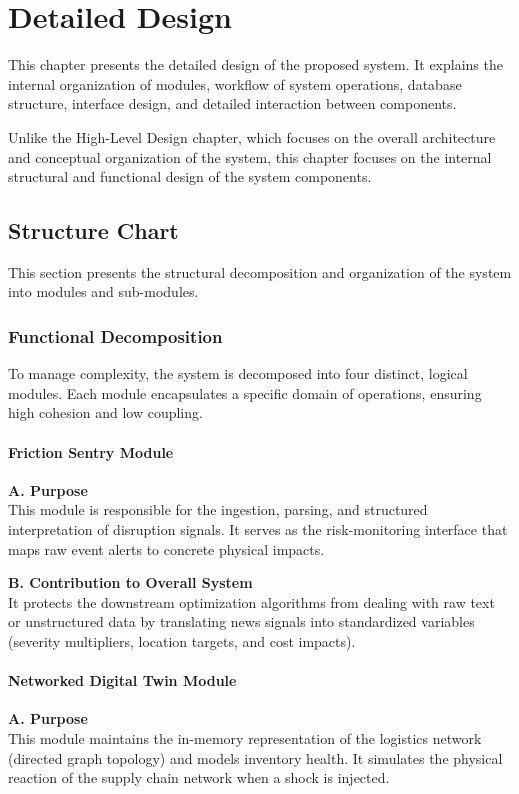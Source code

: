 \chapter[Detailed Design]{Detailed Design}
This chapter presents the detailed design of the proposed system. It explains the internal
organization of modules, workflow of system operations, database structure, interface design,
and detailed interaction between components.

Unlike the High-Level Design chapter, which focuses on the overall architecture and
conceptual organization of the system, this chapter focuses on the internal structural and
functional design of the system components.

 \section[Structure Chart]{Structure Chart}
This section presents the structural decomposition and organization of the system into
modules and sub-modules.
\subsection[Functional Decomposition]{Functional Decomposition}
To manage complexity, the system is decomposed into four distinct, logical modules. Each module encapsulates a specific domain of operations, ensuring high cohesion and low coupling.

\subsubsection{Friction Sentry Module}
\textbf{A. Purpose} \\
This module is responsible for the ingestion, parsing, and structured interpretation of disruption signals. It serves as the risk-monitoring interface that maps raw event alerts to concrete physical impacts.

\textbf{B. Contribution to Overall System} \\
It protects the downstream optimization algorithms from dealing with raw text or unstructured data by translating news signals into standardized variables (severity multipliers, location targets, and cost impacts).

\subsubsection{Networked Digital Twin Module}
\textbf{A. Purpose} \\
This module maintains the in-memory representation of the logistics network (directed graph topology) and models inventory health. It simulates the physical reaction of the supply chain network when a shock is injected.

